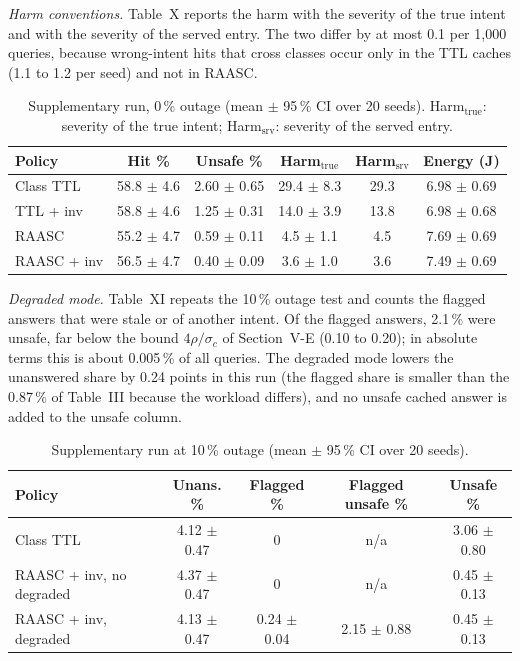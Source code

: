 \emph{Harm conventions.} Table~X reports the harm with the severity of the true intent and with the severity of the served entry. The two differ by at most 0.1 per 1,000 queries, because wrong-intent hits that cross classes occur only in the TTL caches (1.1 to 1.2 per seed) and not in RAASC.

\begin{table}[t]
\centering
\caption{Supplementary run, 0\,\% outage (mean $\pm$ 95\,\% CI over 20 seeds). Harm$_{\mathrm{true}}$: severity of the true intent; Harm$_{\mathrm{srv}}$: severity of the served entry.}
\label{tab:suppX}
\footnotesize
\begin{tabular}{@{}lccccc@{}}
\toprule
Policy & Hit \% & Unsafe \% & Harm$_{\mathrm{true}}$ & Harm$_{\mathrm{srv}}$ & Energy (J)\\
\midrule
Class TTL & 58.8 $\pm$ 4.6 & 2.60 $\pm$ 0.65 & 29.4 $\pm$ 8.3 & 29.3 & 6.98 $\pm$ 0.69\\
TTL + inv & 58.8 $\pm$ 4.6 & 1.25 $\pm$ 0.31 & 14.0 $\pm$ 3.9 & 13.8 & 6.98 $\pm$ 0.68\\
RAASC & 55.2 $\pm$ 4.7 & 0.59 $\pm$ 0.11 & 4.5 $\pm$ 1.1 & 4.5 & 7.69 $\pm$ 0.69\\
RAASC + inv & 56.5 $\pm$ 4.7 & 0.40 $\pm$ 0.09 & 3.6 $\pm$ 1.0 & 3.6 & 7.49 $\pm$ 0.69\\
\bottomrule
\end{tabular}
\end{table}

\emph{Degraded mode.} Table~XI repeats the 10\,\% outage test and counts the flagged answers that were stale or of another intent. Of the flagged answers, 2.1\,\% were unsafe, far below the bound $4\rho/\sigma_c$ of Section~V-E (0.10 to 0.20); in absolute terms this is about 0.005\,\% of all queries. The degraded mode lowers the unanswered share by 0.24 points in this run (the flagged share is smaller than the 0.87\,\% of Table~III because the workload differs), and no unsafe cached answer is added to the unsafe column.

\begin{table}[t]
\centering
\caption{Supplementary run at 10\,\% outage (mean $\pm$ 95\,\% CI over 20 seeds).}
\label{tab:suppXI}
\footnotesize
\begin{tabular}{@{}lcccc@{}}
\toprule
Policy & Unans. \% & Flagged \% & Flagged unsafe \% & Unsafe \%\\
\midrule
Class TTL & 4.12 $\pm$ 0.47 & 0 & n/a & 3.06 $\pm$ 0.80\\
RAASC + inv, no degraded & 4.37 $\pm$ 0.47 & 0 & n/a & 0.45 $\pm$ 0.13\\
RAASC + inv, degraded & 4.13 $\pm$ 0.47 & 0.24 $\pm$ 0.04 & 2.15 $\pm$ 0.88 & 0.45 $\pm$ 0.13\\
\bottomrule
\end{tabular}
\end{table}

